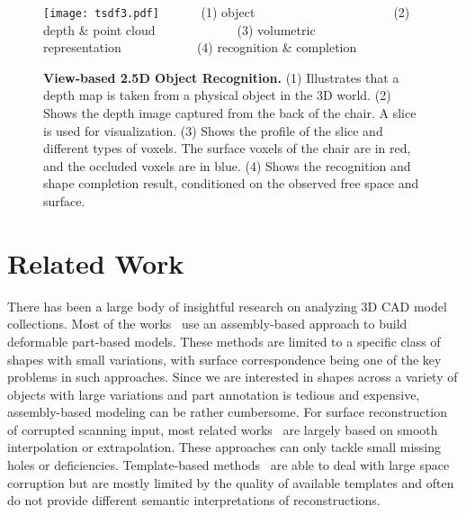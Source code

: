 \documentclass[10pt,twocolumn,letterpaper]{article}
\begin{document}
\begin{figure*}[t]
\centering
\texttt{[image: tsdf3.pdf]}
~~~~~~(1) object~~~~~~~~~~~~~~~~~~~~~~(2) depth \& point cloud~~~~~~~~~~~~~(3) volumetric representation~~~~~~~~~~~~(4) recognition \& completion 

\vspace{-1mm}
\caption{
{\bf View-based 2.5D Object Recognition.}
(1) Illustrates that a depth map is taken from a physical object in the 3D world. 
(2) Shows the depth image captured from the back of the chair. A slice is used for visualization. 
(3) Shows the profile of the slice and different types of voxels.
The surface voxels of the chair  are in red, and the occluded voxels  are in blue.
(4) Shows the recognition and shape completion result, conditioned on the observed free space and surface.}
\label{fig:25Drecognition}
\vspace{-3mm}
\end{figure*}

\section{Related Work}
There has been a large body of insightful research on analyzing 3D CAD model collections. Most of the works~\cite{Sid2011,TomAssembly,Sid2012} use an assembly-based approach to build deformable part-based models. These methods are limited to a specific class of shapes with small variations, with surface correspondence being one of the key problems in such approaches. Since we are interested in shapes across a variety of objects with large variations and part annotation is tedious and expensive, assembly-based modeling can be rather cumbersome.
For surface reconstruction of corrupted scanning input, most related works~\cite{recon2,recon1} are largely based on smooth interpolation or extrapolation. These approaches can only tackle small missing holes or deficiencies. Template-based methods~\cite{Shen2012} are able to deal with large space corruption but are mostly limited by the quality of available templates and often do not provide different semantic interpretations of reconstructions.
\end{document}
